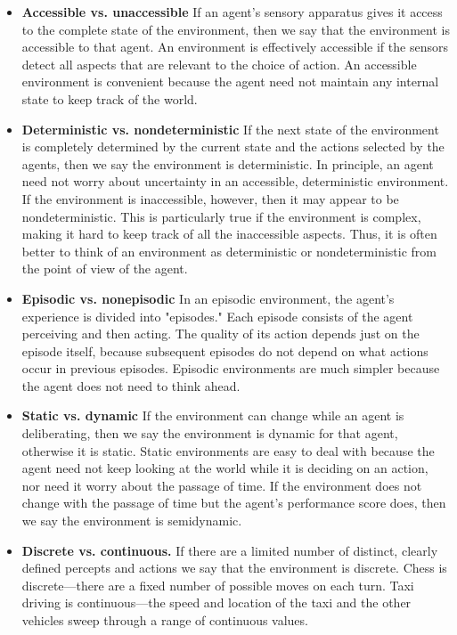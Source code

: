 \begin{itemize}
  \item \textbf{Accessible vs. unaccessible}
  If an agent's sensory apparatus gives it access to the complete state of the environment, then we say that the environment is accessible to that agent. An environment is effectively accessible if the sensors detect all aspects that are relevant to the choice of action. An accessible environment is convenient because the agent need not maintain any internal state to keep track of the world.
  \item \textbf{Deterministic vs. nondeterministic}
  If the next state of the environment is completely determined by the current state and the actions selected by the agents, then we say the environment is deterministic. In principle, an agent need not worry about uncertainty in an accessible, deterministic environment. If the environment is inaccessible, however, then it may appear to be nondeterministic. This is particularly true if the environment is complex, making it hard to keep track of all the inaccessible aspects. Thus, it is often better to think of an environment as deterministic or nondeterministic from the point of view of the agent.
  \item \textbf{Episodic vs. nonepisodic}
  In an episodic environment, the agent's experience is divided into "episodes." Each episode consists of the agent perceiving and then acting. The quality of its action depends just on the episode itself, because subsequent episodes do not depend on what actions occur in previous episodes. Episodic environments are much simpler because the agent does not need to think ahead.
  \item \textbf{Static vs. dynamic}
  If the environment can change while an agent is deliberating, then we say the environment is dynamic for that agent, otherwise it is static. Static environments are easy to deal with because the agent need not keep looking at the world while it is deciding on an action,
  nor need it worry about the passage of time. If the environment does not change with the passage of time but the agent's performance score does, then we say the environment is semidynamic.
  \item \textbf{Discrete vs. continuous.}
  If there are a limited number of distinct, clearly defined percepts and actions we say that the environment is discrete. Chess is discrete—there are a fixed number of possible moves on each turn. Taxi driving is continuous—the speed and location of the taxi and the other vehicles sweep through a range of continuous values.
\end{itemize}

